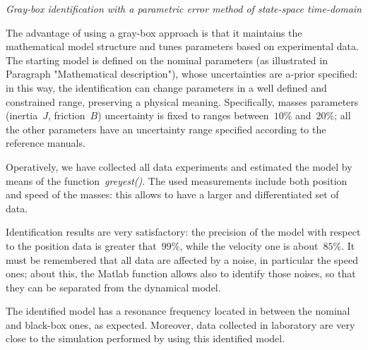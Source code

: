 \textit{Gray-box identification with a parametric error method of state-space time-domain} \\
\par The advantage of using a gray-box approach is that it maintains the mathematical model structure and tunes parameters based on experimental data. The starting model is defined on the nominal parameters (as illustrated in Paragraph "Mathematical description"), whose uncertainties are a-prior specified: in this way, the identification can change parameters in a well defined and constrained range, preserving a physical meaning. Specifically, masses parameters (inertia~$J$, friction~$B$) uncertainty is fixed to ranges between~$10 \%$ and~$20 \%$; all the other parameters have an uncertainty range specified according to the reference manuals.

Operatively, we have collected all data experiments and estimated the model by means of the function~\textit{greyest()}. The used measurements include both position and speed of the masses: this allows to have a larger and differentiated set of data.

Identification results are very satisfactory: the precision of the model with respect to the position data is greater that~$99 \%$, while the velocity one is about~$85 \%$. It must be remembered that all data are affected by a noise, in particular the speed ones; about this, the Matlab function allows also to identify those noises, so that they can be separated from the dynamical model.

The identified model has a resonance frequency located in between the nominal and black-box ones, as expected. Moreover, data collected in laboratory are very close to the simulation performed by using this identified model.
